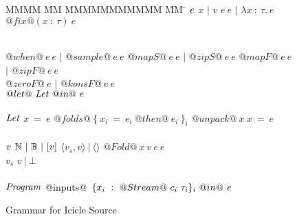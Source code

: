 
\begin{figure}

\begin{tabbing}
MMMM \= MM \= MMMMMMMMMMM \= MM \= \kill
$\mathit{e}$
\GrammarDef $x$
\> $|$ \> $v$
\GrammarAlt $e~e$
\> $|$ \> $\lambda{}x~:~\tau.~e$
\GrammarAlt $@fix@ (x~:~\tau)~e$

\\
\GrammarAlt $@when@~e~e$
\> $|$ \> $@sample@~e~e$
\GrammarAlt $@mapS@~e~e$
\> $|$ \> $@zipS@~e~e$
\GrammarAlt $@mapF@~e~e$
\> $|$ \> $@zipF@~e~e$
\\
\GrammarAlt $@zeroF@~e$
\> $|$ \> $@konsF@~e~e$
\\
\GrammarAlt $@let@~\mathit{Let}~@in@~e$
\\
\\

$\mathit{Let}$
\GrammarDef $x~=~e$
\GrammarAlt $@folds@~\{~x_i~=~e_i~@then@~e_i~\}_i$
\GrammarAlt $@unpack@~x~x~=~e$
\\
\\

$\mathit{v}$
\GrammarDef $\mathbb{N} ~|~ \mathbb{B} ~|~ [v]$
\GrammarAlt $\langle v_s, v \rangle ~|~ \langle\rangle$
\GrammarAlt $@Fold@~x~v~e~e$
\\

$v_s$
\GrammarDef $v ~|~ \bot$
\\
\\


$\mathit{Program}$
\GrammarDef @inputs@~$\{ x_i~:~@Stream@~c_i~\tau_i \}_i~@in@~\mathit{e}$ \\
\end{tabbing}

\caption{Grammar for Icicle Source}
\label{fig:source:grammar}
\end{figure}

